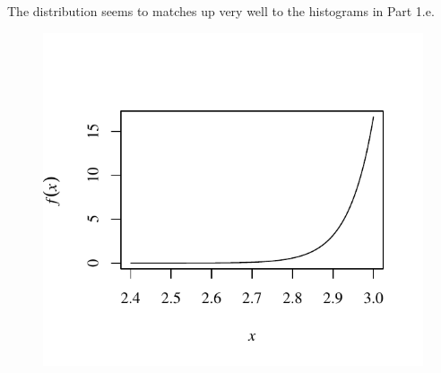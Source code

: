 \documentclass[11pt]{article}
\begin{document}
\subsection{}

The distribution seems to matches up very well to the histograms in Part 1.e.
\begin{figure}[h!]
\begin{center}
\includegraphics[height=0.4\textheight,width=0.6\linewidth]{Graphs/distribution}
\end{center}
\end{figure}

\section{}

\subsection{}
\end{document}

